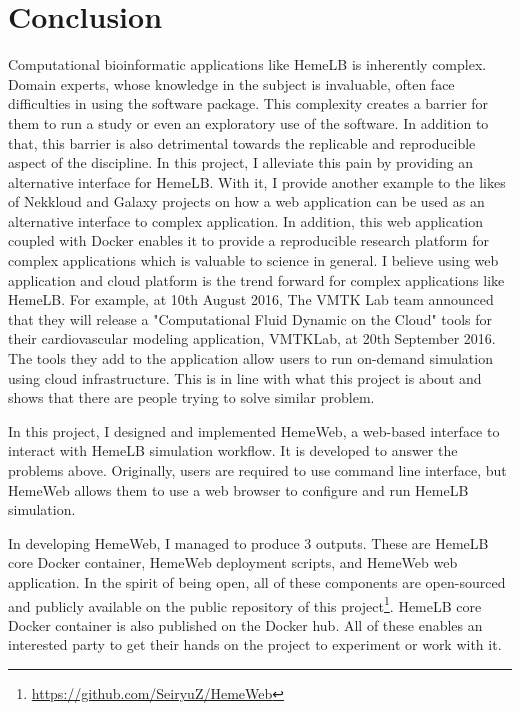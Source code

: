  

\chapter[Conclusion]{Conclusion}


Computational bioinformatic applications like HemeLB is inherently complex. Domain experts, whose knowledge in the subject is invaluable, often face difficulties in using the software package. This complexity creates a barrier for them to run a study or even an exploratory use of the software. In addition to that, this barrier is also detrimental towards the replicable and reproducible aspect of the discipline. In this project, I alleviate this pain by providing an alternative interface for HemeLB. With it, I provide another example to the likes of Nekkloud and Galaxy projects on how a web application can be used as an alternative interface to complex application. In addition, this web application coupled with Docker enables it to provide a reproducible research platform for complex applications which is valuable to science in general. I believe using web application and cloud platform is the trend forward for complex applications like HemeLB. For example, at 10th August 2016, The VMTK Lab team announced that they will release a "Computational Fluid Dynamic on the Cloud" tools for their cardiovascular modeling application, VMTKLab, at 20th September 2016. The tools they add to the application allow users to run on-demand simulation using cloud infrastructure\citep{VMTKL63:online}. This is in line with what this project is about and shows that there are people trying to solve similar problem.


In this project, I designed and implemented HemeWeb, a web-based interface to interact with HemeLB simulation workflow. It is developed to answer the problems above. Originally, users are required to use command line interface, but HemeWeb allows them to use a web browser to configure and run HemeLB simulation. 

In developing HemeWeb, I managed to produce 3 outputs. These are HemeLB core Docker container, HemeWeb deployment scripts, and HemeWeb web application. In the spirit of being open, all of these components are open-sourced and publicly available on the public repository of this project\footnote{\url{https://github.com/SeiryuZ/HemeWeb}}. HemeLB core Docker container is also published on the Docker hub. All of these enables an interested party to get their hands on the project to experiment or work with it.

